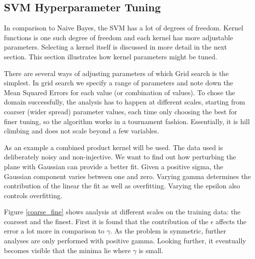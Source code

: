 \documentclass[12pt,notitlepage,twoside]{scrreprt}
\begin{document}
\subsection{SVM Hyperparameter Tuning}
\label{sec:htun}
In comparison to Naive Bayes, the SVM has a lot of degrees of freedom. Kernel functions is
one such degree of freedom and each kernel has more adjustable parameters. Selecting a kernel 
itself is discussed in more detail in the next section. This section illustrates how
kernel parameters might be tuned. 

There are several ways of adjusting parameters of which Grid search is the simplest. In
grid search we specify a range of parameters and note down the Mean Squared Errors for each value (or
combination of values). To chose the domain successfully, the analysis has to happen at
different scales, starting from coarser (wider spread) parameter values, each time only
choosing the best for finer tuning, so the algorithm works in a tournament fashion.
Essentially, it is hill climbing and does not scale beyond a few variables.

As an example a combined product kernel will be used. The data used is deliberately noisy
and non-injective. We want to find out how perturbing the plane with Gaussian can provide a better fit. 
Given a positive sigma, the Gaussian component varies between one and zero.
Varying gamma determines the contribution of the linear the fit as well as overfitting.
Varying the epsilon also controls overfitting.

Figure \ref{coarse_fine} shows analysis at different scales on the training data: the coarsest and the finest.
First it is found that the
contribution of the $\epsilon$ affects the error a lot more in comparison to $\gamma$. As the
problem is symmetric, further analyses are only performed with positive gamma. Looking
further, it eventually becomes visible that the minima lie where $\gamma$ is small. 
\end{document}
